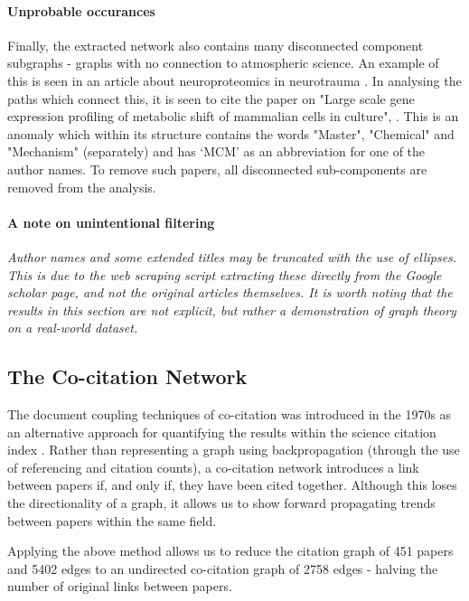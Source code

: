 \paragraph*{Unprobable occurances}
Finally, the extracted network also contains many disconnected component subgraphs - graphs with no connection to atmospheric science. An example of this is seen in an article about neuroproteomics in neurotrauma \citep{neurotrauma}. In analysing the paths which connect this, it is seen to cite the paper on "Large scale gene expression profiling of metabolic shift of mammalian cells in culture", \citep{neuro2}. This is an anomaly which within its structure contains the words "Master", "Chemical" and "Mechanism" (separately) and has `MCM' as an abbreviation for one of the author names. To remove such papers, all disconnected sub-components are removed from the analysis. 



\paragraph*{A note on unintentional filtering}

\textit{
Author names and some extended titles may be truncated with the use of ellipses. This is due to the web scraping script extracting these directly from the Google scholar page, and not the original articles themselves. It is worth noting that the results in this section are not explicit, but rather a demonstration of graph theory on a real-world dataset.
}


\subsection{The Co-citation Network}\label{sec:cocitep}

The document coupling techniques of co-citation was introduced in the 1970s as an alternative approach for quantifying the results within the science citation index \citep{cocite}. Rather than representing a graph using backpropagation (through the use of referencing and citation counts), a co-citation network introduces a link between papers if, and only if, they have been cited together. Although this loses the directionality of a graph, it allows us to show forward propagating trends between papers within the same field. 

Applying the above method allows us to reduce the citation graph of 451 papers and 5402 edges to an undirected co-citation graph of 2758 edges - halving the number of original links between papers. 

